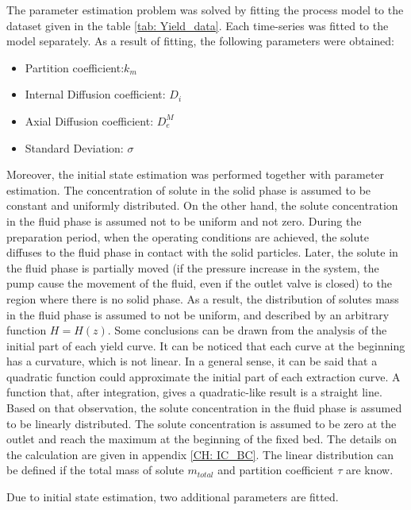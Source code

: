 \documentclass[../Article_Model_Parameters.tex]{subfiles}
\begin{document}
	
	\label{CH: Results}

    The parameter estimation problem was solved by fitting the process model to the dataset given in the table \ref{tab: Yield_data}. Each time-series was fitted to the model separately. As a result of fitting, the following parameters were obtained:

    \begin{itemize}
        \item Partition coefficient:\qquad\quad\qquad$k_m$
        \item Internal Diffusion coefficient: \quad$D_i$
        \item Axial Diffusion coefficient: \qquad$D_e^M$
        \item Standard Deviation: \qquad\qquad\quad$\sigma$
    \end{itemize}

    Moreover, the initial state estimation was performed together with parameter estimation. The concentration of solute in the solid phase is assumed to be constant and uniformly distributed. On the other hand, the solute concentration in the fluid phase is assumed not to be uniform and not zero. During the preparation period, when the operating conditions are achieved, the solute diffuses to the fluid phase in contact with the solid particles. Later, the solute in the fluid phase is partially moved (if the pressure increase in the system, the pump cause the movement of the fluid, even if the outlet valve is closed) to the region where there is no solid phase. As a result, the distribution of solutes mass in the fluid phase is assumed to not be uniform, and described by an arbitrary function $H=H(z)$. Some conclusions can be drawn from the analysis of the initial part of each yield curve. It can be noticed that each curve at the beginning has a curvature, which is not linear. In a general sense, it can be said that a quadratic function could approximate the initial part of each extraction curve. A function that, after integration, gives a quadratic-like result is a straight line. Based on that observation, the solute concentration in the fluid phase is assumed to be linearly distributed. The solute concentration is assumed to be zero at the outlet and reach the maximum at the beginning of the fixed bed. The details on the calculation are given in appendix \ref{CH: IC_BC}. The linear distribution can be defined if the total mass of solute $m_{total}$ and partition coefficient $\tau$ are know.
    
    Due to initial state estimation, two additional parameters are fitted.
\end{document}
